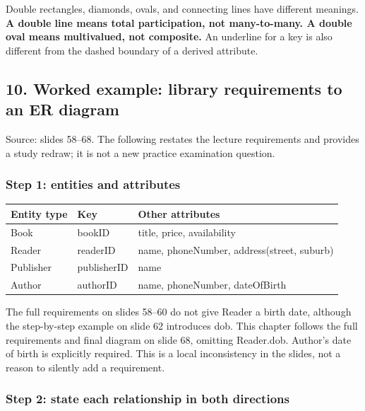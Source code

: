 Double rectangles, diamonds, ovals, and connecting lines have different meanings. \textbf{A double line means total participation, not many-to-many. A double oval means multivalued, not composite.} An underline for a key is also different from the dashed boundary of a derived attribute.

\subsection{10. Worked example: library requirements to an ER diagram}\label{02_er_modelling_en-worked-example-library-requirements-to-an-er-diagram}

Source: slides 58--68. The following restates the lecture requirements and provides a study redraw; it is not a new practice examination question.

\subsubsection{Step 1: entities and attributes}\label{02_er_modelling_en-step-1-entities-and-attributes}

\begin{longtable}[]{@{}lll@{}}
\toprule\noalign{}
Entity type & Key & Other attributes \\
\midrule\noalign{}
\endhead
\bottomrule\noalign{}
\endlastfoot
Book & bookID & title, price, availability \\
Reader & readerID & name, phoneNumber, address(street, suburb) \\
Publisher & publisherID & name \\
Author & authorID & name, phoneNumber, dateOfBirth \\
\end{longtable}

The full requirements on slides 58--60 do not give Reader a birth date, although the step-by-step example on slide 62 introduces dob. This chapter follows the full requirements and final diagram on slide 68, omitting Reader.dob. Author's date of birth is explicitly required. This is a local inconsistency in the slides, not a reason to silently add a requirement.

\subsubsection{Step 2: state each relationship in both directions}\label{02_er_modelling_en-step-2-state-each-relationship-in-both-directions}

